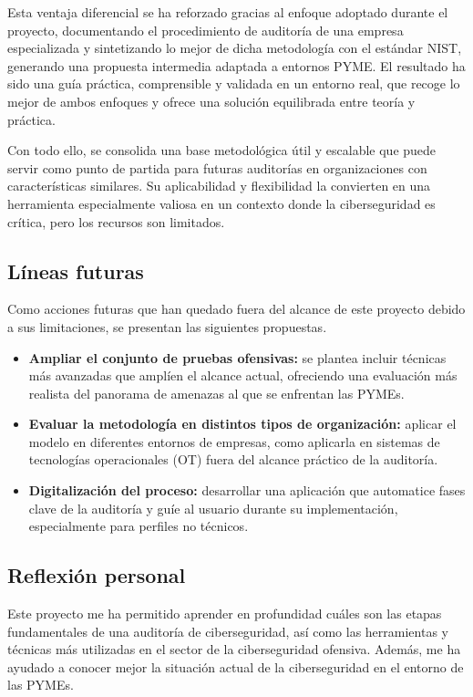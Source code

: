 \documentclass[a4paper, 11pt]{article}
\begin{document}
Esta ventaja diferencial se ha reforzado gracias al enfoque adoptado durante el proyecto, documentando el procedimiento de auditoría de una empresa especializada y sintetizando lo mejor de dicha metodología con el estándar NIST, generando una propuesta intermedia adaptada a entornos PYME. El resultado ha sido una guía práctica, comprensible y validada en un entorno real, que recoge lo mejor de ambos enfoques y ofrece una solución equilibrada entre teoría y práctica.

Con todo ello, se consolida una base metodológica útil y escalable que puede servir como punto de partida para futuras auditorías en organizaciones con características similares. Su aplicabilidad y flexibilidad la convierten en una herramienta especialmente valiosa en un contexto donde la ciberseguridad es crítica, pero los recursos son limitados.

\subsection{Líneas futuras}

Como acciones futuras que han quedado fuera del alcance de este proyecto debido a sus limitaciones, se presentan las siguientes propuestas.

\begin{itemize}
    \item \textbf{Ampliar el conjunto de pruebas ofensivas:} se plantea incluir técnicas más avanzadas que amplíen el alcance actual, ofreciendo una evaluación más realista del panorama de amenazas al que se enfrentan las PYMEs.

    \item \textbf{Evaluar la metodología en distintos tipos de organización:} aplicar el modelo en diferentes entornos de empresas, como aplicarla en sistemas de tecnologías operacionales (OT) fuera del alcance práctico de la auditoría.

    \item \textbf{Digitalización del proceso:} desarrollar una aplicación que automatice fases clave de la auditoría y guíe al usuario durante su implementación, especialmente para perfiles no técnicos.
\end{itemize}


\subsection{Reflexión personal}

Este proyecto me ha permitido aprender en profundidad cuáles son las etapas fundamentales de una auditoría de ciberseguridad, así como las herramientas y técnicas más utilizadas en el sector de la ciberseguridad ofensiva. Además, me ha ayudado a conocer mejor la situación actual de la ciberseguridad en el entorno de las PYMEs. 
\end{document}
